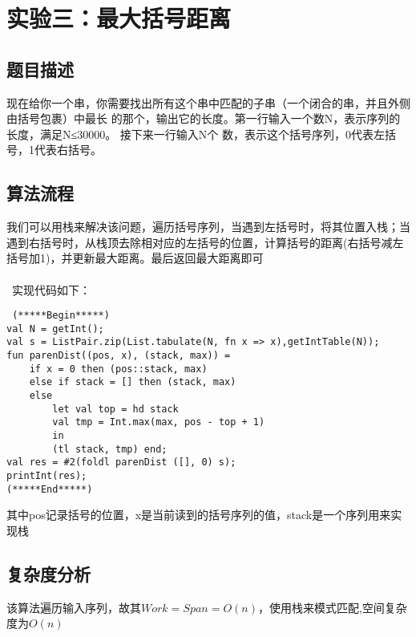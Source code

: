 \documentclass[UTF8,a4paperdui, %
]{ctexart}
\begin{document}
\newpage
\section{实验三：最大括号距离}

\subsection{题目描述}
现在给你一个串，你需要找出所有这个串中匹配的子串（一个闭合的串，并且外侧由括号包裹）中最长
的那个，输出它的长度。第一行输入一个数N，表示序列的长度，满足N≤30000。 接下来一行输入N个
数，表示这个括号序列，0代表左括号，1代表右括号。

\subsection{算法流程}
我们可以用栈来解决该问题，遍历括号序列，当遇到左括号时，将其位置入栈；当遇到右括号时，从栈顶去除相对应的左括号的位置，计算括号的距离(右括号减左括号加1)，并更新最大距离。最后返回最大距离即可\\
\\\
实现代码如下：
\begin{lstlisting}
 (*****Begin*****)			 
val N = getInt();   
val s = ListPair.zip(List.tabulate(N, fn x => x),getIntTable(N));
fun parenDist((pos, x), (stack, max)) =
    if x = 0 then (pos::stack, max) 
    else if stack = [] then (stack, max)
    else
        let val top = hd stack
        val tmp = Int.max(max, pos - top + 1)
        in
        (tl stack, tmp) end; 
val res = #2(foldl parenDist ([], 0) s);
printInt(res);
(*****End*****)
\end{lstlisting}
其中pos记录括号的位置，x是当前读到的括号序列的值，stack是一个序列用来实现栈
\subsection{复杂度分析}
该算法遍历输入序列，故其$Work=Span=O(n)$，使用栈来模式匹配,空间复杂度为$O(n)$
\end{document}
